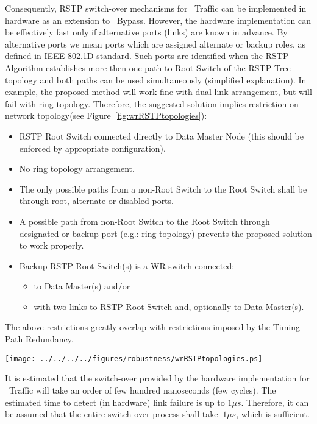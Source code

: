 Consequently, RSTP switch-over mechanisms for \HP\ Traffic can be
implemented in hardware as an extension to \HP\ Bypass. However, the hardware
implementation can be effectively fast only if alternative ports (links) are
known in advance. By alternative ports we mean ports which are assigned
alternate or backup roles, as defined in IEEE 802.1D standard\cite{IEEE8021D}.
Such ports are identified when the RSTP Algorithm establishes more then one path
to Root Switch of the RSTP Tree topology and both paths can be used
simultaneously (simplified explanation). In example, the proposed method will
work fine with dual-link arrangement, but will fail with ring topology.
Therefore, the suggested solution implies restriction on network topology(see
Figure~\ref{fig:wrRSTPtopologies}):
\begin{itemize}
  \item RSTP Root Switch connected directly to Data Master Node
(this should be enforced by appropriate configuration).
  \item No ring topology arrangement. 
  \item The only possible paths from a non-Root Switch to the Root Switch shall
be through root, alternate or disabled ports. 
  \item A possible path from non-Root Switch to the Root Switch through
designated or backup port (e.g.: ring topology) prevents the proposed solution
to work properly.
  \item Backup RSTP Root Switch(s) is a WR switch connected:
  \begin{itemize}
    \item to Data Master(s) and/or
    \item with two links to RSTP Root Switch and, optionally to Data
	  Master(s).
  \end{itemize} 
\end{itemize}
The above restrictions greatly overlap with restrictions imposed by the
Timing Path Redundancy.

\begin{center}
	\texttt{[image: ../../../../figures/robustness/wrRSTPtopologies.ps]}
	\label{fig:wrRSTPtopologies}
\end{center}

It is estimated that the switch-over provided by the hardware implementation
for \HP\ Traffic will take an order of few hundred nanoseconds (few cycles). The
estimated time to detect (in hardware) link failure is up to $1\mu s$.
Therefore, it can be assumed that the entire switch-over process shall take
$~1\mu s$, which is sufficient. 


